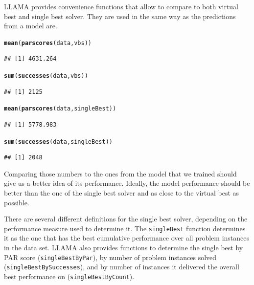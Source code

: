 \documentclass{article}\usepackage[]{graphicx}\usepackage[]{color}
\makeatletter
\newcommand{\hlstd}[1]{\textcolor[rgb]{0.345,0.345,0.345}{#1}}%
\newcommand{\hlkwd}[1]{\textcolor[rgb]{0.737,0.353,0.396}{\textbf{#1}}}%
\newenvironment{kframe}{%
 \def\at@end@of@kframe{}%
 \ifinner\ifhmode%
  \def\at@end@of@kframe{\end{minipage}}%
  \begin{minipage}{\columnwidth}%
 \fi\fi%
 \def\FrameCommand##1{\hskip\@totalleftmargin \hskip-\fboxsep
 \colorbox{shadecolor}{##1}\hskip-\fboxsep
     \hskip-\linewidth \hskip-\@totalleftmargin \hskip\columnwidth}%
 \MakeFramed {\advance\hsize-\width
   \@totalleftmargin\z@ \linewidth\hsize
   \@setminipage}}%
 {\par\unskip\endMakeFramed%
 \at@end@of@kframe}
\newenvironment{knitrout}{}{} %
\makeatother
\begin{document}
LLAMA provides convenience functions that allow to compare to both virtual best
and single best solver. They are used in the same way as the predictions from a
model are.

\begin{knitrout}
\color{fgcolor}\begin{kframe}
\begin{alltt}
\hlkwd{mean}\hlstd{(}\hlkwd{parscores}\hlstd{(data, vbs))}
\end{alltt}
\begin{verbatim}
## [1] 4631.264
\end{verbatim}
\begin{alltt}
\hlkwd{sum}\hlstd{(}\hlkwd{successes}\hlstd{(data, vbs))}
\end{alltt}
\begin{verbatim}
## [1] 2125
\end{verbatim}
\begin{alltt}
\hlkwd{mean}\hlstd{(}\hlkwd{parscores}\hlstd{(data, singleBest))}
\end{alltt}
\begin{verbatim}
## [1] 5778.983
\end{verbatim}
\begin{alltt}
\hlkwd{sum}\hlstd{(}\hlkwd{successes}\hlstd{(data, singleBest))}
\end{alltt}
\begin{verbatim}
## [1] 2048
\end{verbatim}
\end{kframe}
\end{knitrout}

Comparing those numbers to the ones from the model that we trained should give
us a better idea of its performance. Ideally, the model performance should be
better than the one of the single best solver and as close to the virtual best
as possible.

There are several different definitions for the single best solver, depending on
the performance measure used to determine it. The \lstinline{singleBest}
function determines it as the one that has the best cumulative performance over
all problem instances in the data set. LLAMA also provides functions to
determine the single best by PAR score (\lstinline{singleBestByPar}), by number
of problem instances solved (\lstinline{singleBestBySuccesses}), and by number
of instances it delivered the overall best performance on
(\lstinline{singleBestByCount}).
\end{document}
